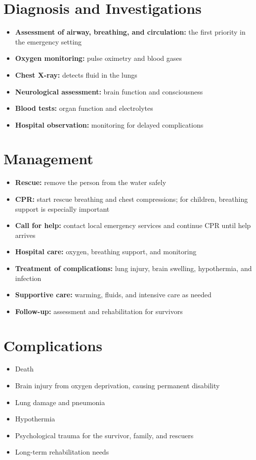 \section*{Diagnosis and Investigations}
\begin{itemize}
    \item \textbf{Assessment of airway, breathing, and circulation:} the first priority in the emergency setting
    \item \textbf{Oxygen monitoring:} pulse oximetry and blood gases
    \item \textbf{Chest X-ray:} detects fluid in the lungs
    \item \textbf{Neurological assessment:} brain function and consciousness
    \item \textbf{Blood tests:} organ function and electrolytes
    \item \textbf{Hospital observation:} monitoring for delayed complications
\end{itemize}

\section*{Management}
\begin{itemize}
    \item \textbf{Rescue:} remove the person from the water safely
    \item \textbf{CPR:} start rescue breathing and chest compressions; for children, breathing support is especially important
    \item \textbf{Call for help:} contact local emergency services and continue CPR until help arrives
    \item \textbf{Hospital care:} oxygen, breathing support, and monitoring
    \item \textbf{Treatment of complications:} lung injury, brain swelling, hypothermia, and infection
    \item \textbf{Supportive care:} warming, fluids, and intensive care as needed
    \item \textbf{Follow-up:} assessment and rehabilitation for survivors
\end{itemize}

\section*{Complications}
\begin{itemize}
    \item Death
    \item Brain injury from oxygen deprivation, causing permanent disability
    \item Lung damage and pneumonia
    \item Hypothermia
    \item Psychological trauma for the survivor, family, and rescuers
    \item Long-term rehabilitation needs
\end{itemize}

